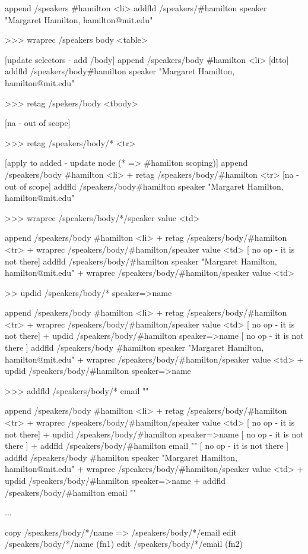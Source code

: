 \documentclass[sigconf,anonymous,screen]{acmart}
\begin{document}
append /speakers \#hamilton <li>
addfld /speakers/\#hamilton speaker "Margaret Hamilton, hamilton@mit.edu"

>>> wraprec /speakers body <table>

[update selectors - add /body]
append /speakers/body \#hamilton <li>
[dtto]
addfld /speakers/body\#hamilton speaker "Margaret Hamilton, hamilton@mit.edu"

>>> retag /spekers/body <tbody>

[na - out of scope]

>>> retag /speakers/body/* <tr>

[apply to added - update node (* => \#hamilton scoping)]
append /speakers/body \#hamilton <li>
+ retag /speakers/body/\#hamilton <tr>
[na - out of scope]
addfld /speakers/body\#hamilton speaker "Margaret Hamilton, hamilton@mit.edu"

>>> wraprec /speakers/body/*/speaker value <td>

append /speakers/body \#hamilton <li>
+ retag /speakers/body/\#hamilton <tr>
+ wraprec /speakers/body/\#hamilton/speaker value <td> [ no op - it is not there]
addfld /speakers/body/\#hamilton speaker "Margaret Hamilton, hamilton@mit.edu"
+ wraprec /speakers/body/\#hamilton/speaker value <td>

>> updid /speakers/body/* speaker=>name

append /speakers/body \#hamilton <li>
+ retag /speakers/body/\#hamilton <tr>
+ wraprec /speakers/body/\#hamilton/speaker value <td> [ no op - it is not there]
+ updid /speakers/body/\#hamilton speaker=>name [ no op - it is not there ]
addfld /speakers/body \#hamilton speaker "Margaret Hamilton, hamilton@mit.edu"
+ wraprec /speakers/body/\#hamilton/speaker value <td>
+ updid /speakers/body/\#hamilton speaker=>name

>>> addfld /speakers/body/* email ""

append /speakers/body \#hamilton <li>
+ retag /speakers/body/\#hamilton <tr>
+ wraprec /speakers/body/\#hamilton/speaker value <td> [ no op - it is not there]
+ updid /speakers/body/\#hamilton speaker=>name [ no op - it is not there ]
+ addfld /speakers/body/\#hamilton email "" [ no op - it is not there ]
addfld /speakers/body \#hamilton speaker "Margaret Hamilton, hamilton@mit.edu"
+ wraprec /speakers/body/\#hamilton/speaker value <td>
+ updid /speakers/body/\#hamilton speaker=>name
+ addfld /speakers/body/\#hamilton email ""

...

copy /speakers/body/*/name => /speakers/body/*/email
edit /speakers/body/*/name (fn1)
edit /speakers/body/*/email (fn2)
































\end{document}
